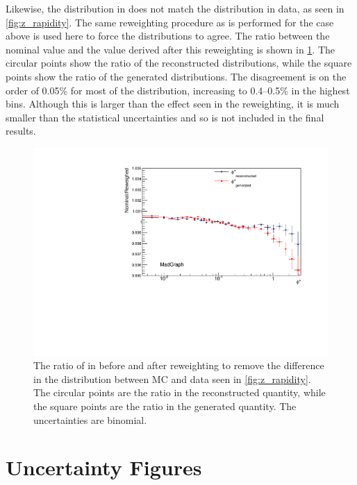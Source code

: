 Likewise, the \Z \rapidity distribution in \MADGRAPH does not match the
distribution in data, as seen in \cref{fig:z_rapidity}. The same
reweighting procedure as is performed for the \mee case above is used here to
force the distributions to agree. The ratio between the nominal \phistar value
and the value derived after this reweighting is shown in
\cref{fig:z_rapidity_reweighted}.
The circular points show the ratio of the
reconstructed \phistar distributions, while the square points show the ratio of
the generated \phistar distributions. The disagreement is on the order of
0.05\% for most of the distribution, increasing to 0.4--0.5\% in the highest
\phistar bins. Although this is larger than the effect seen in the \mee
reweighting, it is much smaller than the statistical uncertainties and so is
not included in the final results.

\begin{figure}[!htbp]
    \centering
    \includegraphics[width=\textwidth]{figures/ZY_reweighed.pdf}
    \caption[
        The ratio of \phistar in \MADGRAPH before and after reweighting to
        remove the differnce in the \rapidity distribution between MC and data.
    ]{
        The ratio of \phistar in \MADGRAPH before and after reweighting to
        remove the difference in the \rapidity distribution between MC and data
        seen in \cref{fig:z_rapidity}. The circular points are the ratio in
        the reconstructed quantity, while the square points are the ratio in
        the generated quantity. The uncertainties are binomial.
    }
    \label{fig:z_rapidity_reweighted}
\end{figure}

\section{Uncertainty Figures}

